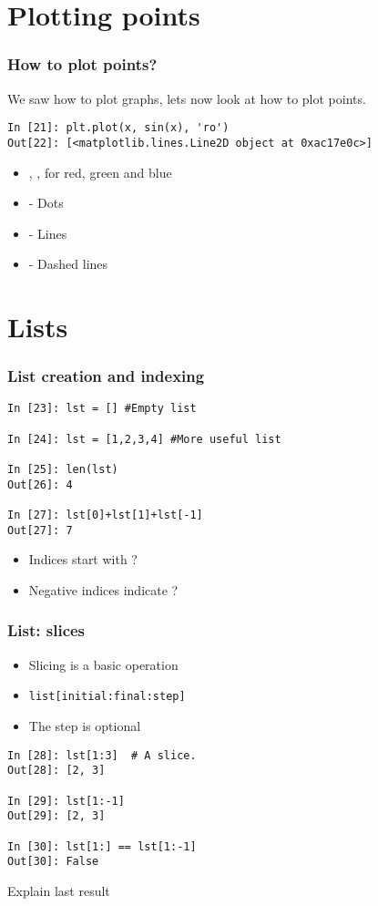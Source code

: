 \documentclass[14pt,compress]{beamer}
\newcounter{time}
\newcommand{\inctime}[1]{\addtocounter{time}{#1}{\tiny \thetime\ m}}
\newcommand{\typ}[1]{\texttt{#1}}
\newcommand{\kwrd}[1]{ \texttt{\textbf{\color{blue}{#1}}}  }
\begin{document}
\section{Plotting points}
\begin{frame}[fragile]
\frametitle{How to plot points?}
We saw how to plot graphs, lets now look at how to plot points.\\
\begin{lstlisting}
In [21]: plt.plot(x, sin(x), 'ro')
Out[22]: [<matplotlib.lines.Line2D object at 0xac17e0c>]
\end{lstlisting}
\begin{itemize}
  \item \kwrd{'r'},\kwrd{'g'},\kwrd{'b'} for red, green and blue
  \item \kwrd{'o'} - Dots
  \item \kwrd{'-'} - Lines
  \item \kwrd{'- -'} - Dashed lines
\end{itemize}
\inctime{5}
\end{frame}

\section{Lists}

\begin{frame}[fragile]
  \frametitle{List creation and indexing}
\begin{lstlisting}
In [23]: lst = [] #Empty list

In [24]: lst = [1,2,3,4] #More useful list

In [25]: len(lst)
Out[26]: 4

In [27]: lst[0]+lst[1]+lst[-1]
Out[27]: 7
\end{lstlisting}
\begin{itemize}
  \item Indices start with ?
  \item Negative indices indicate ?
  \end{itemize}
\end{frame}

\begin{frame}[fragile]
  \frametitle{List: slices}
  \begin{itemize}
  \item Slicing is a basic operation
  \item \typ{list[initial:final:step]}
  \item  The step is optional
  \end{itemize}
\begin{lstlisting}
In [28]: lst[1:3]  # A slice.
Out[28]: [2, 3]

In [29]: lst[1:-1]
Out[29]: [2, 3]

In [30]: lst[1:] == lst[1:-1]
Out[30]: False
\end{lstlisting}
Explain last result
\end{frame}
\end{document}
